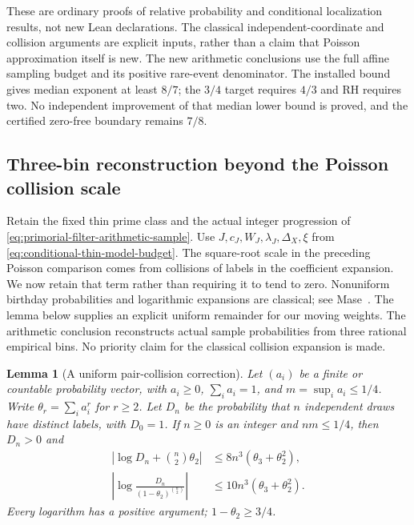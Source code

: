 \documentclass[11pt]{article}
\newtheorem{lemma}[theorem]{Lemma}
\theoremstyle{definition}
\begin{document}
These are ordinary proofs of relative probability and conditional
localization results, not new Lean declarations.
The classical independent-coordinate and collision arguments are
explicit inputs, rather than a claim that Poisson approximation
itself is new.
The new arithmetic conclusions use the full affine sampling budget
and its positive rare-event denominator.
The installed bound gives median exponent at least $8/7$;
the $3/4$ target requires $4/3$ and RH requires two.
No independent improvement of that median lower bound is proved,
and the certified zero-free boundary remains $7/8$.

\subsection{Three-bin reconstruction beyond the Poisson collision scale}
\label{sec:three-bin-reconstruction}

Retain the fixed thin prime class and the actual integer progression
of \eqref{eq:primorial-filter-arithmetic-sample}.
Use $J,c_J,W_J,\lambda_J,\Delta_X,\xi$ from
\eqref{eq:conditional-thin-model-budget}.
The square-root scale in the preceding Poisson comparison comes
from collisions of labels in the coefficient expansion.
We now retain that term rather than requiring it to tend to zero.
Nonuniform birthday probabilities and logarithmic expansions
are classical; see Mase~\cite[\S\S3--5]{MaseCollision}.
The lemma below supplies an explicit uniform remainder for our
moving weights.  The arithmetic conclusion reconstructs actual
sample probabilities from three rational empirical bins.
No priority claim for the classical collision expansion is made.

\begin{lemma}[A uniform pair-collision correction]
\label{lem:uniform-pair-collision-correction}
Let $(a_i)$ be a finite or countable probability vector, with
$a_i\ge0$, $\sum_i a_i=1$, and
$m=\sup_i a_i\le1/4$.
Write $\theta_r=\sum_i a_i^r$ for $r\ge2$.
Let $D_n$ be the probability that $n$ independent draws have
distinct labels, with $D_0=1$.
If $n\ge0$ is an integer and $nm\le1/4$, then $D_n>0$ and
\begin{equation}
 \begin{aligned}
 \left|\log D_n+{n\choose2}\theta_2\right|
       &\le8n^3(\theta_3+\theta_2^2),\\
 \left|\log\frac{D_n}{(1-\theta_2)^{\binom n2}}\right|
       &\le10n^3(\theta_3+\theta_2^2).
 \end{aligned}
 \label{eq:uniform-pair-collision-correction}
\end{equation}
Every logarithm has a positive argument; $1-\theta_2\ge3/4$.
\end{lemma}
\end{document}
